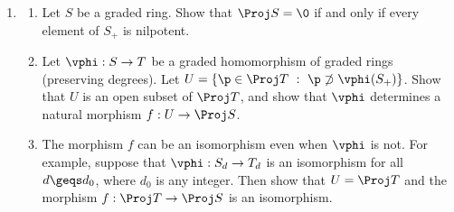 \documentclass[12pt]{amsart}
\begin{document}
\begin{enumerate}
	\item[2.14.] {
      \begin{enumerate}
        \item Let $S$ be a graded ring.
          Show that $\Proj S=\0$ if and only if every element of $S_+$ is nilpotent.
        \item Let $\vphi:S\to T$ be a graded homomorphism of graded rings (preserving degrees).
          Let $U=\{\p\in \Proj T~:~\p\not\supset\vphi(S_+)\}$.
          Show that $U$ is an open subset of $\Proj T$, and show that $\vphi$ determines a natural morphism $f:U\to \Proj S$.
        \item The morphism $f$ can be an isomorphism even when $\vphi$ is not.
          For example, suppose that $\vphi:S_d\to T_d$ is an isomorphism for all $d\geqs d_0$, where $d_0$ is any integer.
          Then show that $U=\Proj T$ and the morphism $f:\Proj T\to \Proj S$ is an isomorphism.
      \end{enumerate}
    }
\end{enumerate}
\end{document}
